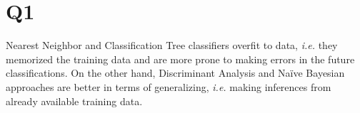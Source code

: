 \documentclass[12pt]{article}
\begin{document}
\section*{Q1}

Nearest Neighbor and Classification Tree classifiers overfit to data, \textit{i.e.} they memorized the training data and are more prone to making errors in the
future classifications. On the other hand,  Discriminant Analysis and Na\"ive Bayesian approaches are better in terms of generalizing, \textit{i.e.} making inferences 
from already available training data.
\end{document}
